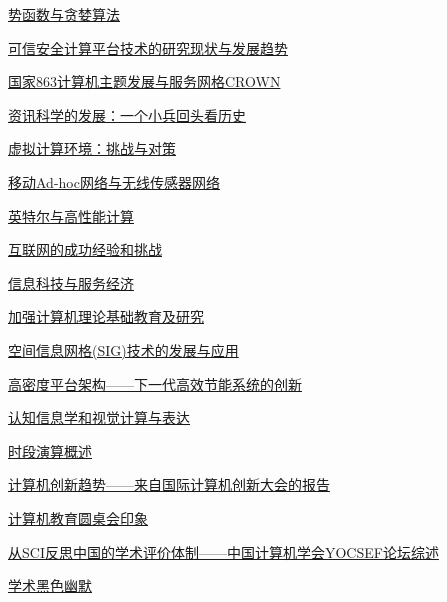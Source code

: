 \documentclass[a4paper]{article}
\begin{document}
\href{http://history.ccf.org.cn/resources/1190201776262/2010/04/15/006051.pdf}{势函数与贪婪算法}

\href{http://history.ccf.org.cn/resources/1190201776262/2010/04/15/006053.pdf}{可信安全计算平台技术的研究现状与发展趋势}

\href{http://history.ccf.org.cn/resources/1190201776262/2010/04/15/006054.pdf}{国家863计算机主题发展与服务网格CROWN}

\href{http://history.ccf.org.cn/resources/1190201776262/2010/04/15/006056.pdf}{资讯科学的发展：一个小兵回头看历史}

\href{http://history.ccf.org.cn/resources/1190201776262/2010/04/15/006057.pdf}{虚拟计算环境：挑战与对策}

\href{http://history.ccf.org.cn/resources/1190201776262/2010/04/15/006058.pdf}{移动Ad-hoc网络与无线传感器网络}

\href{http://history.ccf.org.cn/resources/1190201776262/2010/04/15/006059.pdf}{英特尔与高性能计算}

\href{http://history.ccf.org.cn/resources/1190201776262/2010/04/15/006060.pdf}{互联网的成功经验和挑战}

\href{http://history.ccf.org.cn/resources/1190201776262/2010/04/15/006061.pdf}{信息科技与服务经济}

\href{http://history.ccf.org.cn/resources/1190201776262/2010/04/15/006062.pdf}{加强计算机理论基础教育及研究}

\href{http://history.ccf.org.cn/resources/1190201776262/2010/04/15/006063.pdf}{空间信息网格(SIG)技术的发展与应用}

\href{http://history.ccf.org.cn/resources/1190201776262/2010/04/15/006064.pdf}{高密度平台架构——下一代高效节能系统的创新}

\href{http://history.ccf.org.cn/resources/1190201776262/2010/04/15/006065.pdf}{认知信息学和视觉计算与表达}

\href{http://history.ccf.org.cn/resources/1190201776262/2010/04/15/006066.pdf}{时段演算概述}

\href{http://history.ccf.org.cn/resources/1190201776262/2010/04/15/006067.pdf}{计算机创新趋势——来自国际计算机创新大会的报告}

\href{http://history.ccf.org.cn/resources/1190201776262/2010/04/15/006075.pdf}{计算机教育圆桌会印象}

\href{http://history.ccf.org.cn/resources/1190201776262/2010/04/15/006076.pdf}{从SCI反思中国的学术评价体制——中国计算机学会YOCSEF论坛综述}

\href{http://history.ccf.org.cn/resources/1190201776262/2010/04/15/006079.pdf}{学术黑色幽默}
\end{document}
